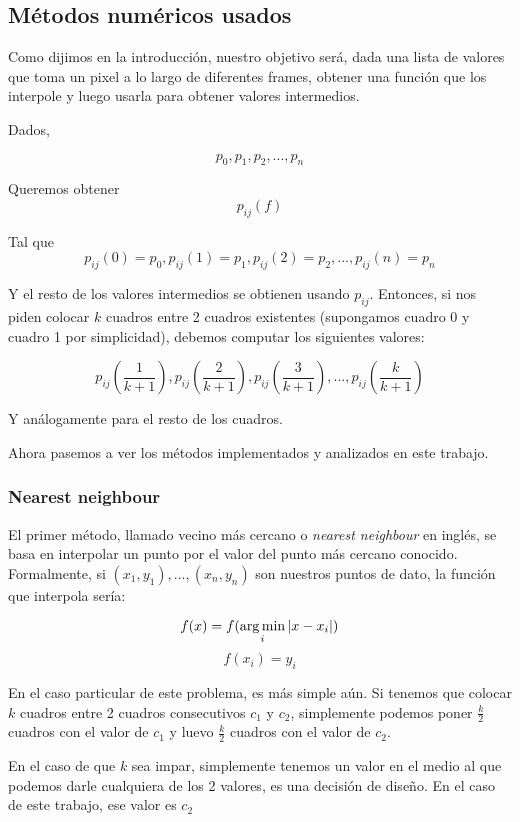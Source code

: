 \subsection{Métodos numéricos usados}

Como dijimos en la introducción, nuestro objetivo será, dada una lista de valores que toma un pixel a lo largo de diferentes frames, obtener una función que los interpole y luego usarla para obtener valores intermedios.

Dados,

\[ p_0, p_1, p_2, ..., p_n \]

Queremos obtener \[p_{ij}(f) \]

Tal que \[p_{ij}(0) = p_0, p_{ij}(1) = p_1, p_{ij}(2) = p_2, ..., p_{ij}(n) = p_n\]

Y el resto de los valores intermedios se obtienen usando $p_{ij}$. Entonces, si nos piden colocar $k$ cuadros entre 2 cuadros existentes (supongamos cuadro 0 y cuadro 1 por simplicidad), debemos computar los siguientes valores:

\[p_{ij}\left(\frac1{k+1}\right), p_{ij}\left(\frac2{k+1}\right), p_{ij}\left(\frac3{k+1}\right), ..., p_{ij}\left(\frac{k}{k+1}\right)\]

Y análogamente para el resto de los cuadros.

Ahora pasemos a ver los métodos implementados y analizados en este trabajo.


\subsubsection{Nearest neighbour}

El primer método, llamado vecino más cercano o \emph{nearest neighbour} en inglés, se basa en interpolar un punto por el valor del punto más cercano conocido. Formalmente, si $(x_1, y_1), ..., (x_n, y_n)$ son nuestros puntos de dato, la función que interpola sería:

\[ f(x) = f(\operatorname*{arg\,min}_{i} |x - x_i|) \]
\[ f(x_i) = y_i \]

En el caso particular de este problema, es más simple aún. Si tenemos que colocar $k$ cuadros entre 2 cuadros consecutivos $c_1$ y $c_2$, simplemente podemos poner $\frac{k}{2}$ cuadros con el valor de $c_1$ y luevo $\frac{k}{2}$ cuadros con el valor de $c_2$.


En el caso de que $k$ sea impar, simplemente tenemos un valor en el medio al que podemos darle cualquiera de los 2 valores, es una decisión de diseño. En el caso de este trabajo, ese valor es $c_2$


